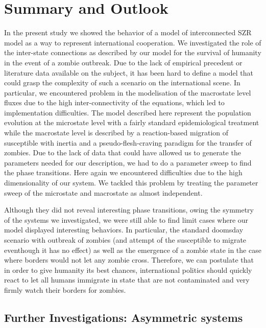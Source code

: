 \documentclass[11pt]{article} %
\begin{document}
\newpage
\section{Summary and Outlook}\indent

In the present study we showed the behavior of a model of interconnected SZR model as a way to represent international cooperation. We investigated the role of the inter-state connections as described by our model for the survival of humanity in the event of a zombie outbreak. Due to the lack of empirical precedent or literature data available on the subject, it has been hard to define a model that could grasp the complexity of such a scenario on the international scene. In particular, we encountered problem in the modelisation of the macrostate level fluxes due to the high inter-connectivity of the equations, which led to implementation difficulties. The model described here represent the population evolution at the microstate level with a fairly standard epidemiological treatment while the macrostate level is described by a reaction-based migration of susceptible with inertia and a pseudo-flesh-craving paradigm for the transfer of zombies. Due to the lack of data that could have allowed us to generate the parameters needed for our description, we had to do a parameter sweep to find the phase transitions. Here again we encountered difficulties due to the high dimensionality of our system. We tackled this problem by treating the parameter sweep of the microstate and macrostate as almost independent. 

Although they did not reveal interesting phase transitions, owing the symmetry of the systems we investigated, we were still able to find limit cases where our model displayed interesting behaviors. In particular, the standard doomsday scenario with outbreak of zombies (and attempt of the susceptible to migrate eventhough it has no effect) as well as the emergence of a zombie state in the case where borders would not let any zombie cross. Therefore, we can postulate that in order to give humanity its best chances, international politics should quickly react to let all humans immigrate in state that are not contaminated and very firmly watch their borders for zombies.
  
\subsection{Further Investigations: Asymmetric systems}\indent
\end{document}
